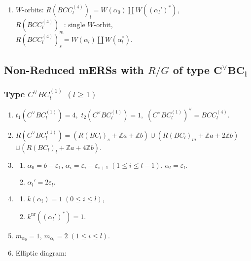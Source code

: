 \documentclass[11pt]{amsart}
\newcommand{\Z}{\mathbb{Z}}
\newcommand{\nr}{\mathrm{nr}}
\newcommand{\vep}{\varepsilon}
\begin{document}
{\begin{enumerate}
\begin{center}
{\begin{tikzpicture}[scale=0.9]
\end{tikzpicture}}
\end{center}
\item $W$-orbits: $R(BCC_l^{(4)})_l=W(\alpha_0) \amalg W((\alpha_l')^\ast)$, \\
\phantom{$W$-orbits:} $R(BCC_l^{(4)})_m$: single $W$-orbit, \\
\phantom{$W$-orbits:} $R(BCC_l^{(4)})_s=W(\alpha_l) \amalg W(\alpha_l^\ast)$.
\end{enumerate}
\bigskip

\subsection{Non-Reduced mERSs with $R/G$ of type $\mathbf{C^\vee BC_l}$}
\label{sect_root-data-non-reduced-2}
\subsubsection{Type $C^\vee BC_l^{(1)}$ $(l\geq 1)$}\label{data:CBC-1}
\begin{enumerate}
\item $t_1(C^\vee BC_l^{(1)})=4,$ \quad $t_2(C^\vee BC_l^{(1)})=1,$ \quad $(C^\vee BC_l^{(1)})^\vee = BCC_l^{(4)}.$
\item $R(C^\vee BC_l^{(1)})=(R(BC_l)_s+\Z a+\Z b) \cup (R(BC_l)_m+\Z a+2\Z b)$ \\
$\cup (R(BC_l)_l+\Z a+4\Z b)$. 
\item 
\begin{enumerate}
\item[i)] $\alpha_0=b-\vep_1$, $\alpha_i=\vep_i-\vep_{i+1}\; 
(1\leq i\leq l-1)$, $\alpha_l=\vep_l$. 
\item[ii)] $\alpha_l'=2\vep_l$.
\end{enumerate}
\item 
\begin{enumerate}
\item[i)] $k(\alpha_i)=1\; (0\leq i\leq l)$,
\item[ii)] $k^{\nr}((\alpha_l')^\ast)=1$. 
\end{enumerate}
\item $m_{\alpha_0}=1$, \; $m_{\alpha_i}=2\; (1\leq i \leq l)$.
\item Elliptic diagram:





\end{enumerate}}
\end{document}
